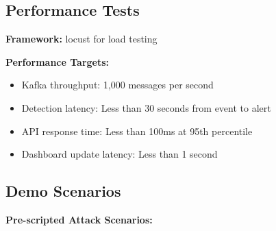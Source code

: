 \documentclass[12pt,a4paper]{article}
\begin{document}
\subsection{Performance Tests}

\textbf{Framework:} locust for load testing

\textbf{Performance Targets:}
\begin{itemize}[leftmargin=1cm,itemsep=0pt]
    \item Kafka throughput: 1,000 messages per second
    \item Detection latency: Less than 30 seconds from event to alert
    \item API response time: Less than 100ms at 95th percentile
    \item Dashboard update latency: Less than 1 second
\end{itemize}

\subsection{Demo Scenarios}

\textbf{Pre-scripted Attack Scenarios:}
\end{document}

